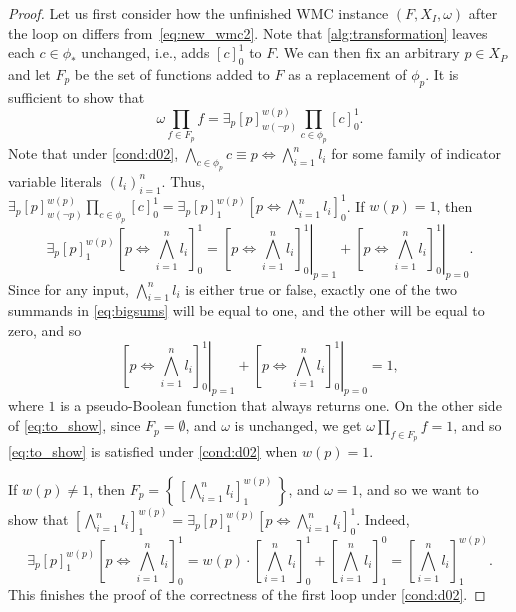 \begin{proof}
  Let us first consider how the unfinished WMC instance $(F, X_I, \omega)$ after
  the loop on  differs
  from~\eqref{eq:new_wmc2}. Note that \cref{alg:transformation} leaves each
  $c \in \phi_*$ unchanged, i.e., adds ${[c]}_0^1$ to $F$. We can then fix an
  arbitrary $p \in X_P$ and let $F_p$ be the set of functions added to $F$ as a
  replacement of $\phi_p$. It is sufficient to show that
  \begin{equation} \label{eq:to_show}
    \omega \prod_{f \in F_p} f = \exists_p {[p]}_{w(\neg p)}^{w(p)} \prod_{c \in \phi_p} {[c]}_0^1.
  \end{equation}
  Note that under \cref{cond:d02},
  $\bigwedge_{c \in \phi_p} c \equiv p \Leftrightarrow \bigwedge_{i=1}^n l_i$
  for some family of indicator variable literals ${(l_i)}_{i=1}^n$. Thus,
  $\exists_p {[p]}_{w(\neg p)}^{w(p)} \prod_{c \in \phi_p} {[c]}_0^1 = \exists_p {[p]}_1^{w(p)} {\left[ p \Leftrightarrow \bigwedge_{i=1}^n l_i \right]}_0^1$.
  If $w(p) = 1$, then
  \begin{equation} \label{eq:bigsums}
    \exists_p {[p]}_1^{w(p)} {\left[ p \Leftrightarrow \bigwedge_{i=1}^n l_i \right]}_0^1 = \left.{\left[ p \Leftrightarrow \bigwedge_{i=1}^n l_i \right]}_0^1\right|_{p=1} + \left.{\left[ p \Leftrightarrow \bigwedge_{i=1}^n l_i \right]}_0^1\right|_{p=0}.
  \end{equation}
  Since for any input, $\bigwedge_{i=1}^n l_i$ is either true or false, exactly
  one of the two summands in \cref{eq:bigsums} will be equal to one, and the
  other will be equal to zero, and so
  \[
    \left.{\left[ p \Leftrightarrow \bigwedge_{i=1}^n l_i \right]}_0^1\right|_{p=1} + \left.{\left[ p \Leftrightarrow \bigwedge_{i=1}^n l_i \right]}_0^1\right|_{p=0} = 1,
  \]
  where $1$ is a pseudo-Boolean function that always returns one. On the other
  side of \cref{eq:to_show}, since $F_p = \emptyset$, and $\omega$ is unchanged,
  we get $\omega\prod_{f \in F_p} f = 1$, and so \cref{eq:to_show} is satisfied
  under \cref{cond:d02} when $w(p) = 1$.

  If $w(p) \ne 1$, then
  $F_p = \left\{\, {\left[ \bigwedge_{i = 1}^n l_i \right]}_1^{w(p)} \,\right\}$, and
  $\omega = 1$, and so we want to show that
  ${\left[ \bigwedge_{i = 1}^n l_i \right]}_1^{w(p)} = \exists_p {[p]}_1^{w(p)} {\left[ p \Leftrightarrow \bigwedge_{i=1}^n l_i \right]}_0^1$.
  Indeed,
  \[
    \exists_p {[p]}_1^{w(p)} {\left[ p \Leftrightarrow \bigwedge_{i=1}^n l_i \right]}_0^1 = w(p) \cdot {\left[ \bigwedge_{i=1}^n l_i \right]}_0^1 + {\left[\bigwedge_{i=1}^n l_i \right]}_1^0 = {\left[ \bigwedge_{i=1}^n l_i \right]}_1^{w(p)}.
  \]
  This finishes the proof of the correctness of the first loop under
  \cref{cond:d02}.


\end{proof}
